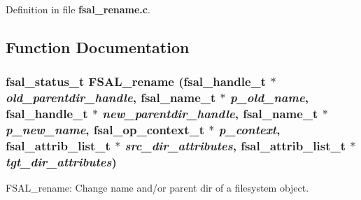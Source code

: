 Definition in file {\bf fsal\_\-rename.c}.

\subsection{Function Documentation}
\subsubsection[{FSAL\_\-rename}]{\setlength{\rightskip}{0pt plus 5cm}fsal\_\-status\_\-t FSAL\_\-rename (fsal\_\-handle\_\-t $\ast$ {\em old\_\-parentdir\_\-handle}, \/  fsal\_\-name\_\-t $\ast$ {\em p\_\-old\_\-name}, \/  fsal\_\-handle\_\-t $\ast$ {\em new\_\-parentdir\_\-handle}, \/  fsal\_\-name\_\-t $\ast$ {\em p\_\-new\_\-name}, \/  fsal\_\-op\_\-context\_\-t $\ast$ {\em p\_\-context}, \/  fsal\_\-attrib\_\-list\_\-t $\ast$ {\em src\_\-dir\_\-attributes}, \/  fsal\_\-attrib\_\-list\_\-t $\ast$ {\em tgt\_\-dir\_\-attributes})}\label{fsal__rename_8c_46b44db12a7817ac3d1fd88cce209d4a}


FSAL\_\-rename: Change name and/or parent dir of a filesystem object.

